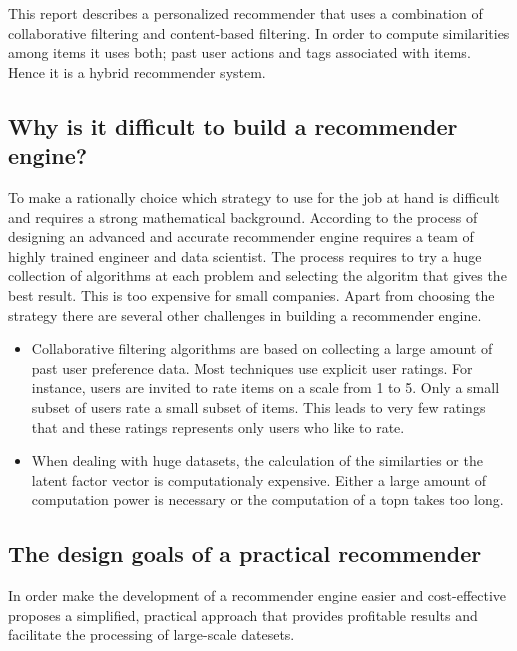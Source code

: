 

This report describes a personalized recommender that uses a combination of collaborative filtering and content-based filtering. In order to compute similarities among items it uses both; past user actions and \glspl{tag} associated with items. Hence it is a hybrid recommender system.

\subsection{Why is it difficult to build a recommender engine?}

To make a rationally choice which strategy to use for the job at hand is difficult and requires a strong mathematical background. According to  \cite{Dunning14} the process of designing an advanced and accurate recommender engine requires a team of highly trained engineer and data scientist. The process requires to try a huge collection of algorithms at each problem and selecting the algoritm that gives the best result. This is too expensive for small companies. Apart from choosing the strategy there are several other challenges in building a recommender engine.

\begin{itemize}
\item Collaborative filtering algorithms are based on collecting a large amount of past user preference data. Most techniques use explicit user ratings. For instance, users are invited to rate items on a scale from 1 to 5. Only a small subset of users rate a small subset of items. This leads to very few ratings that and these ratings represents only users who like to rate.

\item When dealing with huge datasets, the calculation of the similarties or the latent factor vector is computationaly expensive. Either a large amount of computation power is necessary or the computation of a \gls{topn} takes too long.
\end{itemize}

\subsection{The design goals of a practical recommender}
\label{sec:practical}

In order make the development of a recommender engine easier and cost-effective \cite{Dunning14} proposes a simplified, practical approach that provides profitable results and facilitate the processing of large-scale datesets. 

